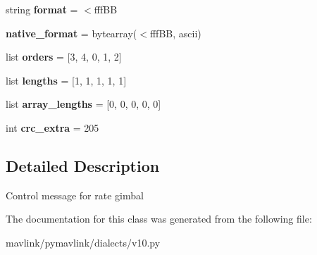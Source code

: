 \begin{DoxyCompactItemize}
string {\bfseries format} = \textquotesingle{}$<$fff\+BB\textquotesingle{}
\item 
\mbox{\label{classpymavlink_1_1dialects_1_1v10_1_1MAVLink__gimbal__control__message_a5eb00590ad37025062dcf2448ce36b68}} 
{\bfseries native\+\_\+format} = bytearray(\textquotesingle{}$<$fff\+BB\textquotesingle{}, \textquotesingle{}ascii\textquotesingle{})
\item 
\mbox{\label{classpymavlink_1_1dialects_1_1v10_1_1MAVLink__gimbal__control__message_abdaf38442b5b80585a1f39ccceb14ba0}} 
list {\bfseries orders} = \mbox{[}3, 4, 0, 1, 2\mbox{]}
\item 
\mbox{\label{classpymavlink_1_1dialects_1_1v10_1_1MAVLink__gimbal__control__message_aae57c96e327c1dcb1c961b2806d45448}} 
list {\bfseries lengths} = \mbox{[}1, 1, 1, 1, 1\mbox{]}
\item 
\mbox{\label{classpymavlink_1_1dialects_1_1v10_1_1MAVLink__gimbal__control__message_a8c15ce4b5b103d5d93461faccd98d7cb}} 
list {\bfseries array\+\_\+lengths} = \mbox{[}0, 0, 0, 0, 0\mbox{]}
\item 
\mbox{\label{classpymavlink_1_1dialects_1_1v10_1_1MAVLink__gimbal__control__message_a21914907cc7045d9360d89143a449d98}} 
int {\bfseries crc\+\_\+extra} = 205
\end{DoxyCompactItemize}


\subsection{Detailed Description}
\begin{DoxyVerb}Control message for rate gimbal
\end{DoxyVerb}
 

The documentation for this class was generated from the following file\+:\begin{DoxyCompactItemize}
\item 
mavlink/pymavlink/dialects/v10.\+py\end{DoxyCompactItemize}
